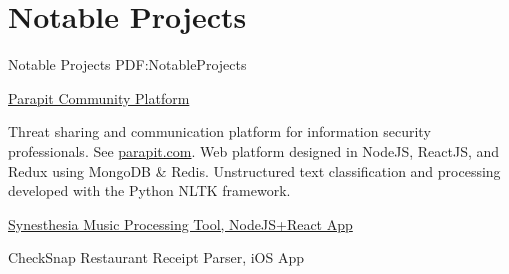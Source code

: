 
\section
{Notable Projects}
{Notable Projects}
{PDF:NotableProjects}

\BulletItem
\href{http://parapit.com}
{Parapit Community Platform}
\hfill
{}
\begin{detail}
\SubBulletItem
Threat sharing and communication platform for information security professionals. See \href{http://parapit.com}{parapit.com}.
\SubBulletItem
Web platform designed in NodeJS, ReactJS, and Redux using MongoDB \& Redis. Unstructured text classification and processing developed with the Python NLTK framework. 
\end{detail}

\GapNoBreak
\BulletItem
\href{https://github.com/bekher/synesthesia}
{Synesthesia Music Processing Tool, NodeJS+React App}
\hfill
{}

\GapNoBreak
\BulletItem
CheckSnap Restaurant Receipt Parser, iOS App
\hfill
{}


